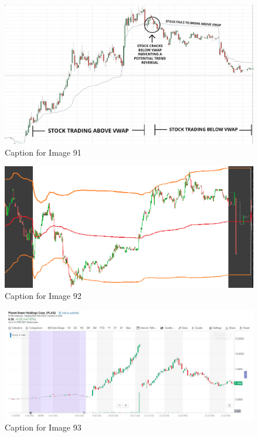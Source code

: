 \documentclass{article}
\begin{document}
\vspace{10pt}

\begin{figure}[!htb]
    \centering
    \includegraphics[width=\textwidth]{imgs/91.png}
    \caption{Caption for Image 91}
\end{figure}

\vspace{10pt}

\begin{figure}[!htb]
    \centering
    \includegraphics[width=\textwidth]{imgs/92.png}
    \caption{Caption for Image 92}
\end{figure}

\vspace{10pt}

\begin{figure}[!htb]
    \centering
    \includegraphics[width=\textwidth]{imgs/93.png}
    \caption{Caption for Image 93}
\end{figure}
\end{document}
